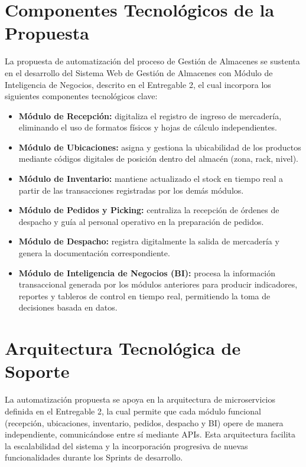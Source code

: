 \documentclass[11pt, a4paper, oneside]{report}
\begin{document}
\section{Componentes Tecnológicos de la Propuesta}

La propuesta de automatización del proceso de Gestión de Almacenes se sustenta en el desarrollo del Sistema Web de Gestión de Almacenes con Módulo de Inteligencia de Negocios, descrito en el Entregable 2, el cual incorpora los siguientes componentes tecnológicos clave:

\begin{itemize}
    \item \textbf{Módulo de Recepción:} digitaliza el registro de ingreso de mercadería, eliminando el uso de formatos físicos y hojas de cálculo independientes.
    \item \textbf{Módulo de Ubicaciones:} asigna y gestiona la ubicabilidad de los productos mediante códigos digitales de posición dentro del almacén (zona, rack, nivel).
    \item \textbf{Módulo de Inventario:} mantiene actualizado el stock en tiempo real a partir de las transacciones registradas por los demás módulos.
    \item \textbf{Módulo de Pedidos y Picking:} centraliza la recepción de órdenes de despacho y guía al personal operativo en la preparación de pedidos.
    \item \textbf{Módulo de Despacho:} registra digitalmente la salida de mercadería y genera la documentación correspondiente.
    \item \textbf{Módulo de Inteligencia de Negocios (BI):} procesa la información transaccional generada por los módulos anteriores para producir indicadores, reportes y tableros de control en tiempo real, permitiendo la toma de decisiones basada en datos.
\end{itemize}

\section{Arquitectura Tecnológica de Soporte}

La automatización propuesta se apoya en la arquitectura de microservicios definida en el Entregable 2, la cual permite que cada módulo funcional (recepción, ubicaciones, inventario, pedidos, despacho y BI) opere de manera independiente, comunicándose entre sí mediante APIs. Esta arquitectura facilita la escalabilidad del sistema y la incorporación progresiva de nuevas funcionalidades durante los Sprints de desarrollo.
\end{document}
